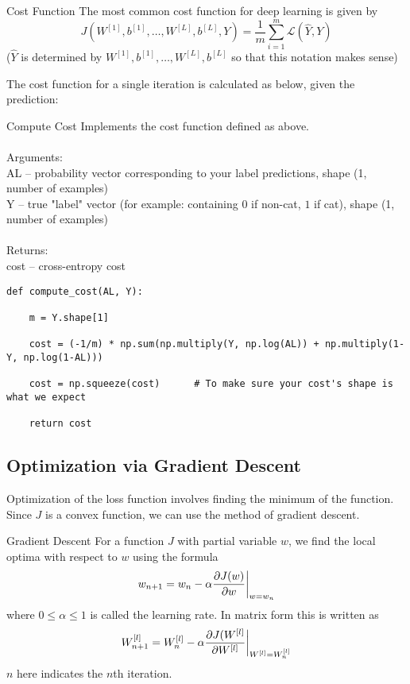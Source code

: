 \documentclass[a4paper]{article}
\begin{document}
\begin{defn}{Cost Function}{} The most common cost function for deep learning is given by $$J(W^{[1]},b^{[1]},\dots,W^{[L]},b^{[L]},Y)=\frac{1}{m}\sum_{i=1}^m\mathcal{L}(\hat{Y},Y)$$ ($\hat{Y}$ is determined by $W^{[1]},b^{[1]},\dots,W^{[L]},b^{[L]}$ so that this notation makes sense)
\end{defn}

The cost function for a single iteration is calculated as below, given the prediction: 

\begin{alg}{Compute Cost}{} Implements the cost function defined as above. \\~\\
Arguments: \\
AL -- probability vector corresponding to your label predictions, shape (1, number of examples)\\
Y -- true "label" vector (for example: containing $0$ if non-cat, $1$ if cat), shape (1, number of examples)\\~\\

Returns: \\
cost  -- cross-entropy cost
\begin{verbatim}
def compute_cost(AL, Y):

    m = Y.shape[1]

    cost = (-1/m) * np.sum(np.multiply(Y, np.log(AL)) + np.multiply(1-Y, np.log(1-AL)))
    
    cost = np.squeeze(cost)      # To make sure your cost's shape is what we expect

    return cost
\end{verbatim}
\end{alg}

\subsection{Optimization via Gradient Descent}
Optimization of the loss function involves finding the minimum of the function. Since $J$ is a convex function, we can use the method of gradient descent. 

\begin{defn}{Gradient Descent}{} For a function $J$ with partial variable $w$, we find the local optima with respect to $w$ using the formula $$w_{n+1}=w_n-\alpha\frac{\partial J(w)}{\partial w}\bigg{|}_{w=w_n}$$ where $0\leq\alpha\leq 1$ is called the learning rate. In matrix form this is written as $$W_{n+1}^{[l]}=W_n^{[l]}-\alpha\frac{\partial J(W^{[l]}}{\partial W^{[l]}}\bigg{|}_{W^{[l]}=W_n^{[l]}}$$ $n$ here indicates the $n$th iteration. 
\end{defn}
\end{document}
